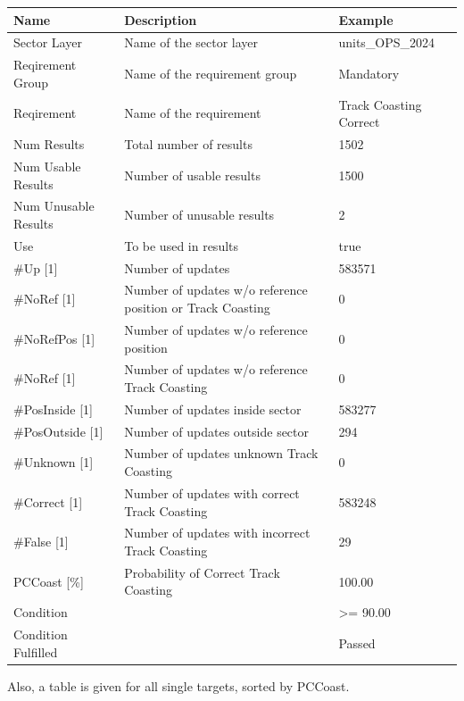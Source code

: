 \begin{center}
 \begin{table}[H]
  \begin{tabularx}{\textwidth}{ | l | X |  l | }
    \hline
    \textbf{Name} & \textbf{Description} & \textbf{Example} \\ \hline
    Sector Layer & Name of the sector layer & units\_OPS\_2024 \\ \hline
    Reqirement Group & Name of the requirement group & Mandatory \\ \hline
    Reqirement & Name of the requirement & Track Coasting Correct \\ \hline
    Num Results & Total number of results & 1502 \\ \hline
    Num Usable Results & Number of usable results & 1500 \\ \hline
    Num Unusable Results & Number of unusable results & 2 \\ \hline
    Use & To be used in results & true \\ \hline
    \#Up [1] & Number of updates & 583571 \\ \hline
    \#NoRef [1] & Number of updates w/o reference position or Track Coasting & 0 \\ \hline
    \#NoRefPos [1] & Number of updates w/o reference position & 0 \\ \hline
    \#NoRef [1] & Number of updates w/o reference Track Coasting & 0 \\ \hline
    \#PosInside [1] & Number of updates inside sector & 583277 \\ \hline
    \#PosOutside [1] & Number of updates outside sector & 294 \\ \hline
    \#Unknown [1] & Number of updates unknown Track Coasting & 0 \\ \hline
    \#Correct [1] & Number of updates with correct Track Coasting & 583248 \\ \hline
    \#False [1] & Number of updates with incorrect Track Coasting & 29 \\ \hline
    PCCoast [\%] & Probability of Correct Track Coasting & 100.00 \\ \hline
    Condition &  & >= 90.00 \\ \hline
    Condition Fulfilled &  & Passed \\ \hline
    \end{tabularx}
\end{table}
\end{center}

Also, a table is given for all single targets, sorted by PCCoast.

